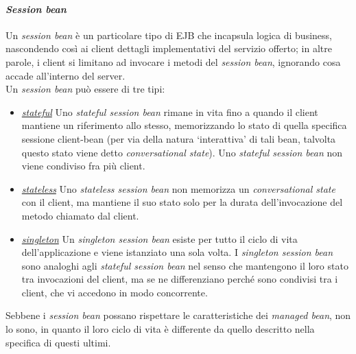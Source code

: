 \paragraph{\textit{Session bean}} Un \textit{session bean} è un particolare tipo di EJB che incapsula logica di business, nascondendo così ai client dettagli implementativi del servizio offerto; in altre parole, i client si limitano ad invocare i metodi del \textit{session bean}, ignorando cosa accade all'interno del server.\\
Un \textit{session bean} può essere di tre tipi:
\begin{itemize}
\item \underline{\textit{stateful}} Uno \textit{stateful session bean} rimane in vita fino a quando il client mantiene un riferimento allo stesso, memorizzando lo stato di quella specifica sessione client-bean (per via della natura \textquoteleft interattiva\textquoteright{} di tali bean, talvolta questo stato viene detto \textit{conversational state}). Uno \textit{stateful session bean} non viene condiviso fra più client.
\item \underline{\textit{stateless}} Uno \textit{stateless session bean} non memorizza un \textit{conversational state} con il client, ma mantiene il suo stato solo per la durata dell'invocazione del metodo chiamato dal client.
\item \underline{\textit{singleton}} Un \textit{singleton session bean} esiste per tutto il ciclo di vita dell'applicazione e viene istanziato una sola volta. I \textit{singleton session bean} sono analoghi agli \textit{stateful session bean} nel senso che mantengono il loro stato tra invocazioni del client, ma se ne differenziano perché sono condivisi tra i client, che vi accedono in modo concorrente.
\end{itemize}

Sebbene i \textit{session bean} possano rispettare le caratteristiche dei \textit{managed bean}, non lo sono, in quanto il loro ciclo di vita è differente da quello descritto nella specifica di questi ultimi.\\




